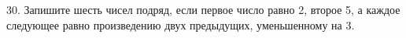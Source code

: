 30. Запишите шесть чисел подряд, если первое число равно 2, второе 5, а каждое следующее равно произведению двух предыдущих, уменьшенному на 3.\\
